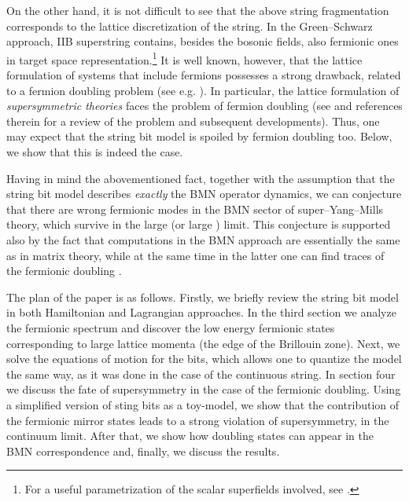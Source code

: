 \documentclass[a4paper]{article}
\begin{document}
On the other hand, it is not difficult to see that the above
string fragmentation corresponds to the lattice discretization of
the string. In the Green--Schwarz approach, IIB superstring
contains, besides the bosonic fields, also fermionic ones in target space
representation.\footnote{For a useful parametrization of the scalar
superfields involved, see \cite{B1}.}
It is well known, however, that the lattice
formulation of systems that include fermions possesses a strong
drawback, related to a fermion doubling problem (see e.g.
\cite{Montvay:lat}). In particular, the lattice formulation of
\emph{supersymmetric theories} faces the problem of fermion
doubling (see \cite{Montvay:2001aj,Montvay:1998ak} and references
therein for a review of the problem and subsequent developments).
Thus, one may expect that the string bit model is spoiled by
fermion doubling too. Below, we show that this is indeed the case.

Having in mind the abovementioned fact, together with the
assumption that the string bit model describes \emph{exactly} the
BMN operator dynamics, we can conjecture that there are wrong
fermionic modes in the BMN sector of super--Yang--Mills theory,
which survive in the large \coordHE{} (or large \coordHE{}) limit. This
conjecture is supported also by the fact that computations in the
BMN approach are essentially the same as in matrix theory, while
at the same time in the latter one can find traces of the
fermionic doubling \cite{Sochichiu:2000fs}.

The plan of the paper is as follows. Firstly, we briefly review
the string bit model in both Hamiltonian and Lagrangian
approaches. In the third section we analyze the fermionic spectrum
and discover the low energy fermionic states corresponding to
large lattice momenta (the edge of the Brillouin zone). Next, we
solve the equations of motion for the bits, which allows one to
quantize the model the same way, as it was done in the case of the
continuous string. In section four we discuss the fate of
supersymmetry in the case of the fermionic doubling. Using a
simplified version of sting bits as a toy-model, we show that the
contribution of the fermionic mirror states leads to a strong violation
of supersymmetry, in the continuum limit. After that, we show how
doubling states can appear in the BMN correspondence and, finally,
we discuss the results.
\end{document}

